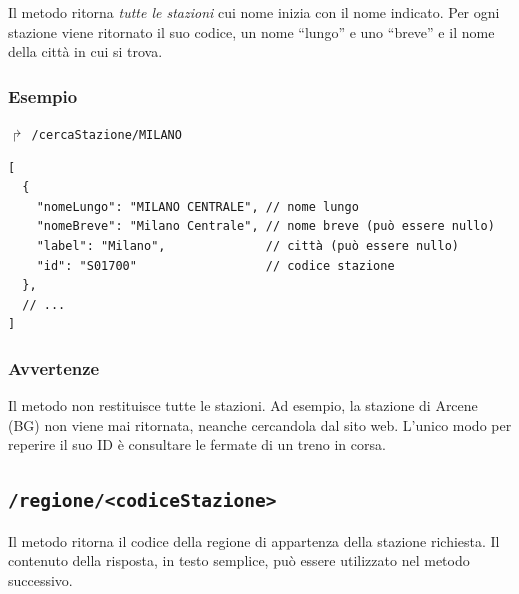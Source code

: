 \documentclass[12pt,a4paper,italian]{report}
\begin{document}
Il metodo ritorna \textit{tutte le stazioni} cui nome inizia con il
nome indicato.  Per ogni stazione viene ritornato il suo codice, un
nome ``lungo'' e uno ``breve'' e il nome della città in cui si trova.

\subsubsection{Esempio}

$\Rsh$ \texttt{/cercaStazione/MILANO}
\begin{verbatim}
[
  {
    "nomeLungo": "MILANO CENTRALE", // nome lungo
    "nomeBreve": "Milano Centrale", // nome breve (può essere nullo)
    "label": "Milano",              // città (può essere nullo)
    "id": "S01700"                  // codice stazione
  },
  // ...
]
\end{verbatim}

\subsubsection{Avvertenze}

Il metodo non restituisce tutte le stazioni.  Ad esempio, la stazione
di Arcene (BG) non viene mai ritornata, neanche cercandola dal sito
web.  L'unico modo per reperire il suo ID è consultare le fermate di
un treno in corsa.

\subsection{\texttt{/regione/<codiceStazione>}}

Il metodo ritorna il codice della regione di appartenza della stazione
richiesta.  Il contenuto della risposta, in testo semplice, può essere
utilizzato nel metodo successivo.
\end{document}
